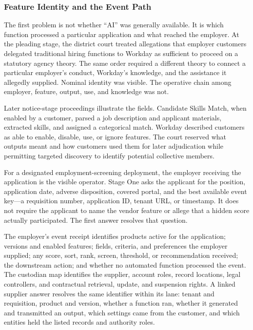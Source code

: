 \subsubsection{Feature Identity and the Event Path}

The first problem is not whether ``AI'' was generally available. It is which function processed a particular application and what reached the employer. At the pleading stage, the district court treated allegations that employer customers delegated traditional hiring functions to Workday as sufficient to proceed on a statutory agency theory. The same order required a different theory to connect a particular employer's conduct, Workday's knowledge, and the assistance it allegedly supplied. Nominal identity was visible. The operative chain among employer, feature, output, use, and knowledge was not.

Later notice-stage proceedings illustrate the fields. Candidate Skills Match, when enabled by a customer, parsed a job description and applicant materials, extracted skills, and assigned a categorical match. Workday described customers as able to enable, disable, use, or ignore features. The court reserved what outputs meant and how customers used them for later adjudication while permitting targeted discovery to identify potential collective members.

For a designated employment-screening deployment, the employer receiving the application is the visible operator. Stage One asks the applicant for the position, application date, adverse disposition, covered portal, and the best available event key---a requisition number, application ID, tenant URL, or timestamp. It does not require the applicant to name the vendor feature or allege that a hidden score actually participated. The first answer resolves that question.

The employer's event receipt identifies products active for the application; versions and enabled features; fields, criteria, and preferences the employer supplied; any score, sort, rank, screen, threshold, or recommendation received; the downstream action; and whether no automated function processed the event. The custodian map identifies the supplier, account roles, record locations, legal controllers, and contractual retrieval, update, and suspension rights. A linked supplier answer resolves the same identifier within its lane: tenant and requisition, product and version, whether a function ran, whether it generated and transmitted an output, which settings came from the customer, and which entities held the listed records and authority roles.


